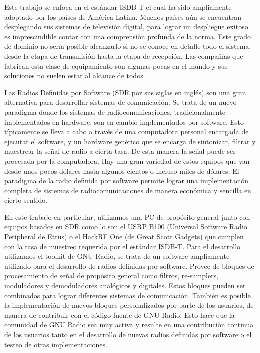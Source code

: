 \documentclass[journal,comsoc]{IEEEtran}
\begin{document}
Este trabajo se enfoca en el estándar ISDB-T el cual ha sido ampliamente adoptado por los países de América Latina. Muchos países aún se encuentran desplegando sus sistemas de televisión digital, para lograr un despliegue exitoso es imprescindible contar con una comprensión profunda de la norma. Este grado de dominio no sería posible alcanzarlo si no se conoce en detalle todo el sistema, desde la etapa de transmisión hasta la etapa de recepción. Las compañías que fabrican esta clase de equipamiento son algunas pocas en el mundo y sus soluciones no suelen estar al alcance de todos. 

Las Radios Definidas por Software (SDR por sus siglas en inglés) son una gran alternativa para desarrollar sistemas de comunicación. Se trata de un nuevo paradigma donde los sistemas de radiocomunicaciones, tradicionalmente implementados en hardware, son en cambio implementados por software. Esto típicamente se lleva a cabo a través de una computadora personal encargada de ejecutar el software, y un hardware genérico que se encarga de sintonizar, filtrar y muestrear la señal de radio a cierta tasa. De esta manera la señal puede ser procesada por la computadora. Hay una gran variedad de estos equipos que van desde unos pocos dólares hasta algunos cientos o incluso miles de dólares. El paradigma de la radio definida por software permite lograr una implementación completa de sistemas de radiocomunicaciones de manera económica y sencilla en cierto sentido. 

En este trabajo en particular, utilizamos una PC de propósito general junto con equipos basados en SDR como lo son el USRP B100 (Universal Software Radio Peripheral de Ettus)\cite{b100} o el HackRF One (de Great Scott Gadgets) \cite{GreatScottGadgets} que cumplen con la tasa de muestreo requerida por el estándar ISDB-T.
Para el desarrollo utilizamos el toolkit de GNU Radio, se trata de un software ampliamente utilizado para el desarrollo de radios definidas por software. Provee de bloques de procesamiento de señal de propósito general como filtros, re-samplers, moduladores y demoduladores analógicos y digitales. Estos bloques pueden ser combinados para lograr diferentes sistemas de comunicación. También es posible la implementación de nuevos bloques personalizados por parte de los usuarios, de manera de contribuir con el código fuente de GNU Radio. Esto hace que la comunidad de GNU Radio sea muy activa y resulte en una contribución continua de los usuarios tanto en el desarrollo de nuevas radios definidas por software o el testeo de otras implementaciones.
\end{document}
